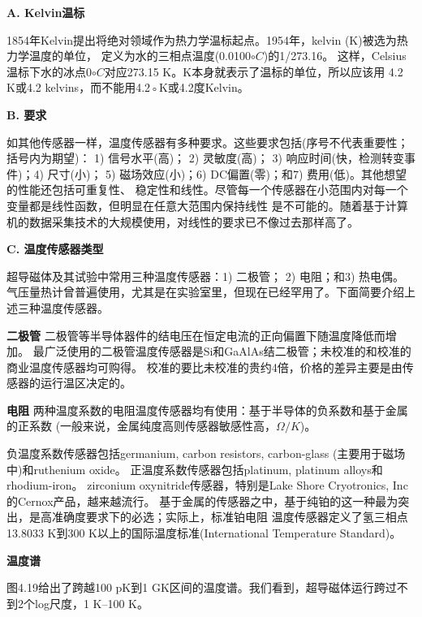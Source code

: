 \textbf{A. Kelvin温标}

1854年Kelvin提出将绝对领域作为热力学温标起点。1954年，kelvin (K)被选为热力学温度的单位，
定义为水的三相点温度(0.0100$\circ C$)的1/273.16。
这样，Celsius温标下水的冰点0$\circ C$对应273.15 K。K本身就表示了温标的单位，所以应该用
4.2 K或4.2 kelvins，而不能用4.2◦K或4.2度Kelvin。

\textbf{B. 要求}

如其他传感器一样，温度传感器有多种要求。这些要求包括(序号不代表重要性；括号内为期望)：
1) 信号水平(高)； 2) 灵敏度(高)； 3) 响应时间(快，检测转变事件)；4) 尺寸(小)；
5) 磁场效应(小)；6) DC偏置(零)；和7) 费用(低)。其他想望的性能还包括可重复性、
稳定性和线性。尽管每一个传感器在小范围内对每一个变量都是线性函数，但明显在任意大范围内保持线性
是不可能的。随着基于计算机的数据采集技术的大规模使用，对线性的要求已不像过去那样高了。

\textbf{C. 温度传感器类型}

超导磁体及其试验中常用三种温度传感器：1) 二极管； 2) 电阻；和3) 热电偶。
气压量热计曾普遍使用，尤其是在实验室里，但现在已经罕用了。下面简要介绍上述三种温度传感器。

\textbf{二极管} 二极管等半导体器件的结电压在恒定电流的正向偏置下随温度降低而增加。
最广泛使用的二极管温度传感器是Si和GaAlAs结二极管；未校准的和校准的商业温度传感器均可购得。
校准的要比未校准的贵约4倍，价格的差异主要是由传感器的运行温区决定的。

\textbf{电阻} 两种温度系数的电阻温度传感器均有使用：基于半导体的负系数和基于金属的正系数
(一般来说，金属纯度高则传感器敏感性高，$\Omega/K$)。

负温度系数传感器包括germanium, carbon resistors, carbon-glass (主要用于磁场中)和ruthenium oxide。
正温度系数传感器包括platinum, platinum alloys和rhodium-iron。
zirconium oxynitride传感器，特别是Lake Shore Cryotronics, Inc的Cernox产品，越来越流行。
基于金属的传感器之中，基于纯铂的这一种最为突出，是高准确度要求下的必选；实际上，标准铂电阻
温度传感器定义了氢三相点13.8033 K到300 K以上的国际温度标准(International Temperature Standard)。

\textbf{温度谱}

图4.19给出了跨越100 pK到1 GK区间的温度谱。我们看到，超导磁体运行跨过不到2个log尺度，1 K–100 K。

